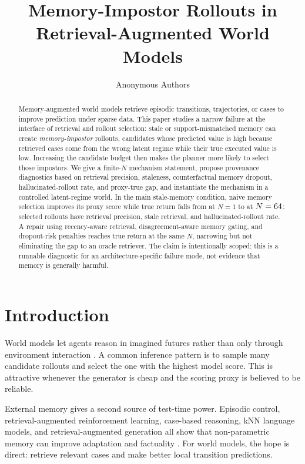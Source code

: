 \documentclass{article}
\title{Memory-Impostor Rollouts in Retrieval-Augmented World Models}
\author{Anonymous Authors}
\begin{document}
\maketitle

\begin{abstract}
Memory-augmented world models retrieve episodic transitions, trajectories, or cases
to improve prediction under sparse data. This paper studies a narrow failure at
the interface of retrieval and rollout selection: stale or support-mismatched
memory can create \emph{memory-impostor} rollouts, candidates whose predicted
value is high because retrieved cases come from the wrong latent regime while
their true executed value is low. Increasing the candidate budget then makes
the planner more likely to select those impostors. We give a finite-$N$
mechanism statement, propose provenance diagnostics based on retrieval
precision, staleness, counterfactual memory dropout, hallucinated-rollout rate,
and proxy-true gap, and instantiate the mechanism in a controlled
latent-regime world. In the main stale-memory condition, naive memory selection
improves its proxy score while true return falls from \NaiveNOneTrue{} at
$N=1$ to \NaiveMaxTrue{} at $N=64{}$; selected rollouts have
\NaiveMaxPrecision{} retrieval precision, \NaiveMaxStale{} stale retrieval,
and \NaiveMaxHallucination{} hallucinated-rollout rate. A repair using
recency-aware retrieval, disagreement-aware memory gating, and dropout-risk
penalties reaches \RepairedMaxTrue{} true return at the same $N$, narrowing
but not eliminating the gap to an oracle retriever. The claim is intentionally
scoped: this is a runnable diagnostic for an architecture-specific failure
mode, not evidence that memory is generally harmful.
\end{abstract}

\section{Introduction}

World models let agents reason in imagined futures rather than only through
environment interaction \citep{sutton1990dyna,ha2018worldmodels,hafner2019planet,hafner2020dreamer,schrittwieser2020muzero}. A
common inference pattern is to sample many candidate rollouts and select the one
with the highest model score. This is attractive whenever the generator is cheap
and the scoring proxy is believed to be reliable.

External memory gives a second source of test-time power. Episodic control,
retrieval-augmented reinforcement learning, case-based reasoning, kNN language
models, and retrieval-augmented generation all show that non-parametric memory
can improve adaptation and factuality
\citep{aamodt1994cbr,pritzel2017nec,wayne2018merlin,khandelwal2020knnlm,guu2020realm,lewis2020rag,goyal2022rarl}. For world
models, the hope is direct: retrieve relevant cases and make better local
transition predictions.
\end{document}
